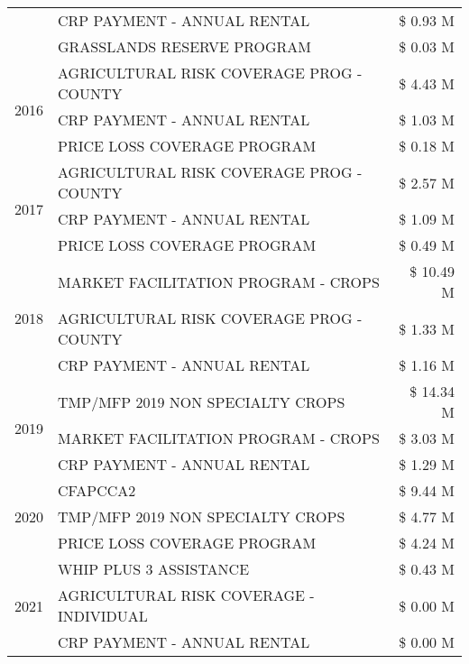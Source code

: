 \begin{tabular}{llr}
 & CRP PAYMENT - ANNUAL RENTAL & \$ 0.93 M \\
 & GRASSLANDS RESERVE PROGRAM & \$ 0.03 M \\
\cline{1-3}
\multirow[t]{3}{*}{2016} & AGRICULTURAL RISK COVERAGE PROG - COUNTY & \$ 4.43 M \\
 & CRP PAYMENT - ANNUAL RENTAL & \$ 1.03 M \\
 & PRICE LOSS COVERAGE PROGRAM & \$ 0.18 M \\
\cline{1-3}
\multirow[t]{3}{*}{2017} & AGRICULTURAL RISK COVERAGE PROG - COUNTY & \$ 2.57 M \\
 & CRP PAYMENT - ANNUAL RENTAL & \$ 1.09 M \\
 & PRICE LOSS COVERAGE PROGRAM & \$ 0.49 M \\
\cline{1-3}
\multirow[t]{3}{*}{2018} & MARKET FACILITATION PROGRAM - CROPS & \$ 10.49 M \\
 & AGRICULTURAL RISK COVERAGE PROG - COUNTY & \$ 1.33 M \\
 & CRP PAYMENT - ANNUAL RENTAL & \$ 1.16 M \\
\cline{1-3}
\multirow[t]{3}{*}{2019} & TMP/MFP 2019 NON SPECIALTY CROPS & \$ 14.34 M \\
 & MARKET FACILITATION PROGRAM - CROPS & \$ 3.03 M \\
 & CRP PAYMENT - ANNUAL RENTAL & \$ 1.29 M \\
\cline{1-3}
\multirow[t]{3}{*}{2020} & CFAPCCA2 & \$ 9.44 M \\
 & TMP/MFP 2019 NON SPECIALTY CROPS & \$ 4.77 M \\
 & PRICE LOSS COVERAGE PROGRAM & \$ 4.24 M \\
\cline{1-3}
\multirow[t]{3}{*}{2021} & WHIP PLUS 3 ASSISTANCE & \$ 0.43 M \\
 & AGRICULTURAL RISK COVERAGE - INDIVIDUAL & \$ 0.00 M \\
 & CRP PAYMENT - ANNUAL RENTAL & \$ 0.00 M \\
\cline{1-3}
\bottomrule
\end{tabular}
